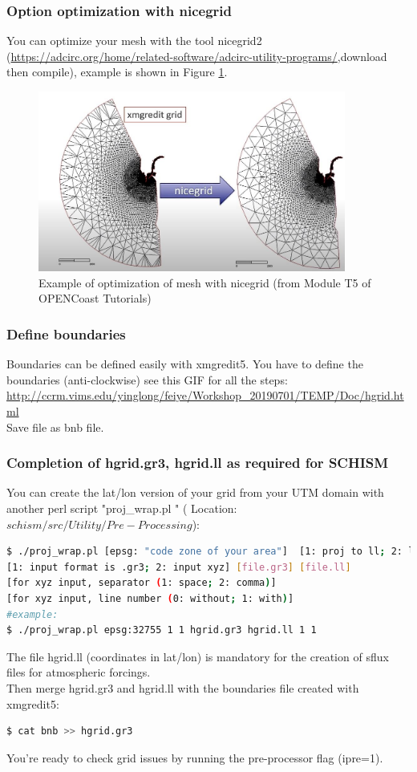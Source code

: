\documentclass[preprints,briefreport,accept,oneauthor,pdftex]{Definitions/mdpi}
\begin{document}
\subsubsection{Option optimization with nicegrid}
You can optimize your mesh with the tool nicegrid2 (\url{https://adcirc.org/home/related-software/adcirc-utility-programs/},download then compile), example is shown in Figure \ref{fig:nicegrid}.
\begin{figure}[htbp]
    \centering
    \includegraphics[width=0.9\textwidth]{figures/nicegrid2.JPG}
    \caption{Example of optimization of mesh with nicegrid (from Module T5 of OPENCoast Tutorials)}
    \label{fig:nicegrid}
\end{figure}
\subsubsection{Define boundaries}
\noindent Boundaries can be defined easily with xmgredit5. You have to define the boundaries (anti-clockwise) see this GIF for all the steps: \\
\url{http://ccrm.vims.edu/yinglong/feiye/Workshop_20190701/TEMP/Doc/hgrid.html}\\
Save file as bnb file.
\subsubsection{Completion of hgrid.gr3, hgrid.ll as required for SCHISM}
\noindent You can create the lat/lon version of your grid from your UTM domain with another perl script "proj\_wrap.pl " ( Location: $schism/src/Utility/Pre-Processing$):
\begin{lstlisting}[language=bash]
$ ./proj_wrap.pl [epsg: "code zone of your area"]  [1: proj to ll; 2: ll to proj] 
[1: input format is .gr3; 2: input xyz] [file.gr3] [file.ll] 
[for xyz input, separator (1: space; 2: comma)] 
[for xyz input, line number (0: without; 1: with)]
#example:
$ ./proj_wrap.pl epsg:32755 1 1 hgrid.gr3 hgrid.ll 1 1 
\end{lstlisting}
The file hgrid.ll (coordinates in lat/lon) is mandatory for the creation of sflux files for atmospheric forcings.\\
Then merge hgrid.gr3 and hgrid.ll with the boundaries file created with xmgredit5:
\begin{lstlisting}[language=bash]
$ cat bnb >> hgrid.gr3
\end{lstlisting}
You're ready to check grid issues by running the pre-processor flag (ipre=1).
\end{document}
